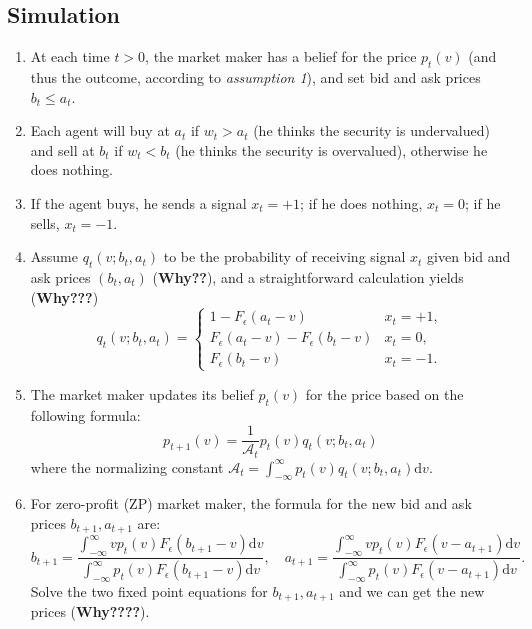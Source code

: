 \documentclass{article}
\begin{document}
\subsection*{Simulation}
\begin{enumerate}
    \item At each time $t>0$, the market maker has a belief for the price $p_t(v)$ (and thus the outcome, according to \textit{assumption 1}), and set bid and ask prices $b_t\leq a_t$.
    \item Each agent will buy at $a_t$ if $w_t>a_t$ (he thinks the security is undervalued) and sell at $b_t$ if $w_t<b_t$ (he thinks the security is overvalued), otherwise he does nothing.
    \item If the agent buys, he sends a signal $x_t=+1$; if he does nothing, $x_t=0$; if he sells, $x_t=-1$.
    \item Assume $q_t(v;b_t,a_t)$ to be the probability of receiving signal $x_t$ given bid and ask prices $(b_t,a_t)$ (\textbf{Why??}), and a straightforward calculation yields (\textbf{Why???})
          \[ q_t(v;b_t,a_t)=\begin{cases}
                  1-F_\epsilon(a_t-v)                 & x_t=+1, \\
                  F_\epsilon(a_t-v)-F_\epsilon(b_t-v) & x_t=0,  \\
                  F_\epsilon(b_t-v)                   & x_t=-1.
              \end{cases} \]
    \item The market maker updates its belief $p_t(v)$ for the price based on the following formula:
          \[ p_{t+1}(v)=\dfrac{1}{\mathcal{A}_t}p_t(v)q_t(v;b_t,a_t) \] where the normalizing constant $\mathcal{A}_t=\int_{-\infty}^{\infty}p_t(v)q_t(v;b_t,a_t)\mathrm{d}v$.
    \item For zero-profit (ZP) market maker, the formula for the new bid and ask prices $b_{t+1},a_{t+1}$ are:
          \[ b_{t+1}=\frac{\int_{-\infty}^{\infty}vp_t(v)F_\epsilon(b_{t+1}-v)\mathrm{d}v}{\int_{-\infty}^{\infty}p_t(v)F_\epsilon(b_{t+1}-v)\mathrm{d}v},\quad a_{t+1}=\frac{\int_{-\infty}^{\infty}vp_t(v)F_\epsilon(v-a_{t+1})\mathrm{d}v}{\int_{-\infty}^{\infty}p_t(v)F_\epsilon(v-a_{t+1})\mathrm{d}v}. \]
          Solve the two fixed point equations for $b_{t+1},a_{t+1}$ and we can get the new prices (\textbf{Why????}).
\end{enumerate}
\end{document}
